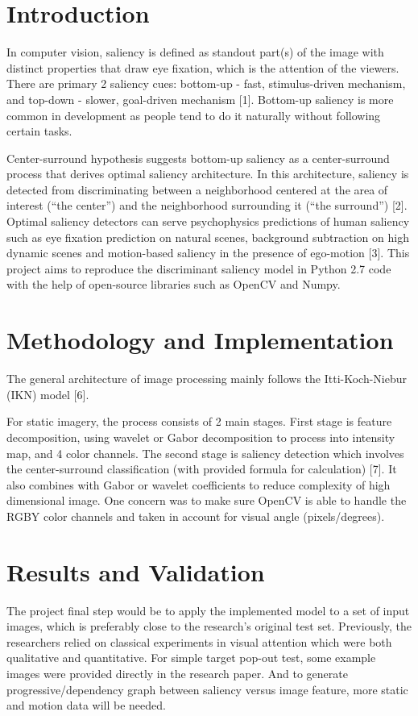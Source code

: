 \documentclass[conference]{IEEEtran}
\begin{document}
\section{Introduction}
In computer vision, saliency is defined as standout part(s) of the image with distinct properties that draw eye fixation, which is the attention of the viewers. There are primary 2 saliency cues: bottom-up - fast, stimulus-driven mechanism, and top-down - slower, goal-driven mechanism [1]. Bottom-up saliency is more common in development as people tend to do it naturally without following certain tasks. 

Center-surround hypothesis suggests bottom-up saliency as a center-surround process that derives optimal saliency architecture. In this architecture, saliency is detected from discriminating between a neighborhood centered at the area of interest (“the center”) and the neighborhood surrounding it (“the surround”) [2]. Optimal saliency detectors can serve psychophysics predictions of human saliency such as eye fixation prediction on natural scenes, background subtraction on high dynamic scenes and motion-based saliency in the presence of ego-motion [3]. This project aims to reproduce the discriminant saliency model in Python 2.7 code with the help of open-source libraries such as OpenCV and Numpy.

\section{Methodology and Implementation}
The general architecture of image processing mainly follows the Itti-Koch-Niebur (IKN) model [6]. 

For static imagery, the process consists of 2 main stages. First stage is feature decomposition, using wavelet or Gabor decomposition to process into intensity map, and 4 color channels. The second stage is saliency detection which involves the center-surround classification (with provided formula for calculation) [7]. It also combines with Gabor or wavelet coefficients to reduce complexity of high dimensional image. One concern was to make sure OpenCV is able to handle the RGBY color channels and taken in account for visual angle (pixels/degrees). 


\section{Results and Validation}
The project final step would be to apply the implemented model to a set of input images, which is preferably close to the research’s original test set. Previously, the researchers relied on classical experiments in visual attention which were both qualitative and quantitative. For simple target pop-out test, some example images were provided directly in the research paper. And to generate progressive/dependency graph between saliency versus image feature, more static and motion data will be needed. 
\end{document}
